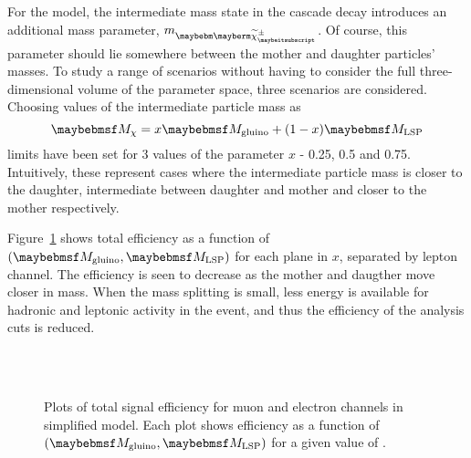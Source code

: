 \subsubsection{\TthreeW}
For the \TthreeW model, the intermediate mass state in the cascade decay
introduces an additional mass parameter, $m_{\PScharginopm}$. Of course, this
parameter should lie somewhere between the mother and daughter particles'
masses. To study a range of scenarios without having to consider the full
three-dimensional volume of the parameter space, three scenarios are
considered. Choosing values of the intermediate particle mass as
\begin{equation*}
\Mchargino = x \Mgluino + (1-x)\Mlsp
\end{equation*}
limits have been set for 3 values of the parameter $x$ - 0.25, 0.5 and
0.75. Intuitively, these represent cases where the intermediate particle mass is
closer to the daughter, intermediate between daughter and mother and closer to
the mother respectively.

Figure~\ref{fig:inter_t3w_eff} shows total efficiency as a function of
$(\Mgluino, \Mlsp)$ for each plane in $x$, separated by lepton channel. The
efficiency is seen to decrease as the mother and daugther move closer in
mass. When the mass splitting is small, less energy is available for hadronic
and leptonic activity in the event, and thus the efficiency of the analysis cuts
is reduced.

\begin{figure}[h!]
\centering
{}
\\
\\
\caption[Plots of total signal efficiency for muon and electron channels in
\TthreeW simplified mode]{Plots of total signal efficiency for muon and electron
  channels in \TthreeW simplified model. Each plot shows efficiency as a function
  of $(\Mgluino, \Mlsp)$ for a given value of \Mchargino.}
\label{fig:inter_t3w_eff}
\end{figure}

